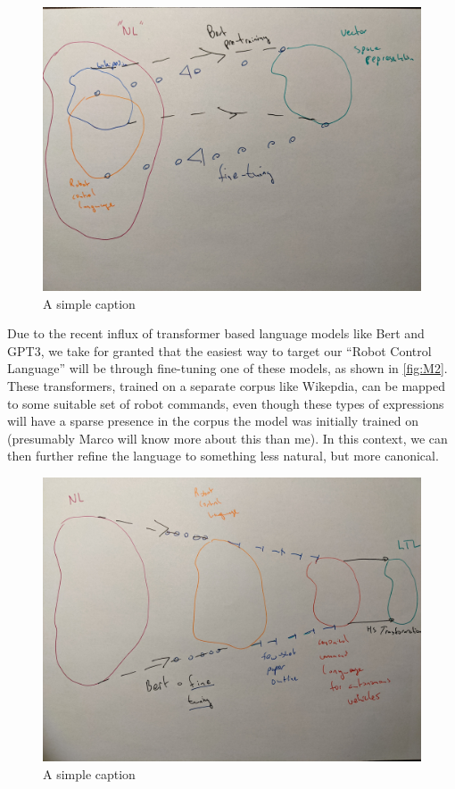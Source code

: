 \documentclass[a4paper, 11pt]{article}
\begin{document}
\begin{figure}[H]
\centering
\includegraphics[width=150mm]{pics/two.jpg}
\caption{A simple caption}\label{fig:M2}
\end{figure}

Due to the recent influx of transformer based language models like Bert and
GPT3, we take for granted that the easiest way to target our ``Robot Control
Language'' will be through fine-tuning one of these models, as shown in \autoref{fig:M2}. These transformers, trained on a
separate corpus like Wikepdia, can be mapped to some suitable set of robot commands, even
though these types of expressions will have a sparse presence in the corpus the
model was initially trained on
(presumably Marco will know more about this than me). In this context, we can
then further refine the language to something less natural, but more canonical.

\begin{figure}[H]
\centering
\includegraphics[width=150mm]{pics/three.jpg}
\caption{A simple caption}\label{fig:M3}
\end{figure}
\end{document}
